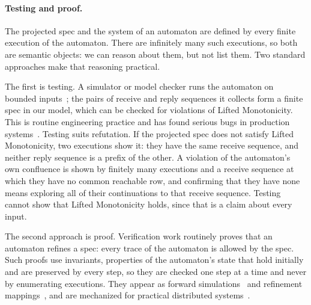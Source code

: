 \paragraph{Testing and proof.}
The projected spec and the system of an automaton are defined by every finite
execution of the automaton.  There are infinitely many such executions, so
both are semantic objects: we can reason about them, but not list them.  Two
standard approaches make that reasoning practical.

The first is testing.  A simulator or model checker runs the automaton on
bounded inputs~\cite{misra1986des,flanagan2005dpor}; the pairs of receive and
reply sequences it collects form a finite spec in our model, which can be
checked for violations of Lifted Monotonicity.  This is routine engineering
practice and has found serious bugs in production
systems~\cite{newcombe2015aws,zhou2021foundationdb}.  Testing suits
refutation.  If the projected spec does not satisfy Lifted Monotonicity, two
executions show it:
they have the same receive sequence, and neither reply sequence is a prefix of
the other.  A violation of the automaton's own confluence is shown by finitely
many executions and a receive sequence at which they have no common reachable
row, and confirming that they have none means exploring all of their
continuations to that receive sequence.  Testing cannot show that Lifted
Monotonicity holds, since that is a claim about every input.

The second approach is proof.  Verification work routinely proves that an
automaton refines a spec: every trace of the automaton is allowed by the spec.
Such proofs use invariants, properties of the automaton's state that hold
initially and are preserved by every step, so they are checked one step at a
time and never by enumerating executions.  They appear as forward
simulations~\cite{lynch1995forward} and refinement
mappings~\cite{abadi1991refinement}, and are mechanized for practical
distributed systems~\cite{hawblitzel2015ironfleet}.

